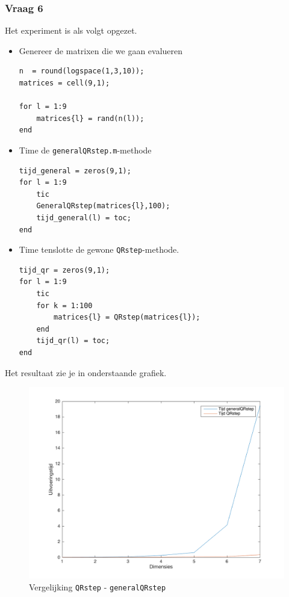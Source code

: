 \documentclass{article}
\begin{document}
\newpage
\subsubsection*{Vraag 6}
Het experiment is als volgt opgezet. 
\begin{itemize}
    \item Genereer de matrixen die we gaan evalueren\\
    \vspace{-5mm}
    \begin{lstlisting}
n  = round(logspace(1,3,10));
matrices = cell(9,1);

for l = 1:9
    matrices{l} = rand(n(l));
end
    \end{lstlisting}
    \item Time de \texttt{generalQRstep.m}-methode\\
    \vspace{-5mm}
    \begin{lstlisting}
tijd_general = zeros(9,1);
for l = 1:9
    tic
    GeneralQRstep(matrices{l},100);
    tijd_general(l) = toc;
end
    \end{lstlisting}
    \item Time tenslotte de gewone \texttt{QRstep}-methode.\\
    \vspace{-5mm}
    \begin{lstlisting}
tijd_qr = zeros(9,1);
for l = 1:9
    tic
    for k = 1:100
        matrices{l} = QRstep(matrices{l});
    end
    tijd_qr(l) = toc;
end
    \end{lstlisting}
\end{itemize}

Het resultaat zie je in onderstaande grafiek.

\begin{figure}[H]
\includegraphics[width=\linewidth]{laatsteplot}
\caption{Vergelijking \texttt{QRstep} - \texttt{generalQRstep}}
\end{figure}
\end{document}
